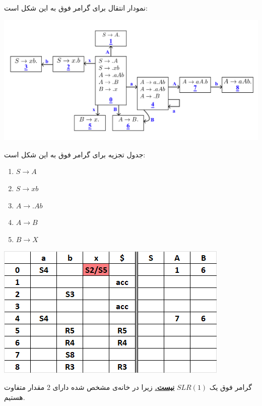 نمودار انتقال برای گرامر فوق به این شکل است:

\qquad\qquad\qquad\qquad\qquad\includegraphics[width=1\linewidth]{figs/5.png}

جدول تجزیه برای گرامر فوق به این شکل است:

\setLTR

\begin{enumerate}
	\item $S\rightarrow A$
	\item $S\rightarrow xb$
	\item $A\rightarrow .Ab$
	\item $A\rightarrow B$
	\item $B\rightarrow X$					
\end{enumerate}

\setRTL

\quad\qquad\qquad\includegraphics[width=0.7\linewidth]{figs/6.png}

گرامر فوق یک
 $SLR(1)$
 \textbf{\underline{نیست.}}
 زیرا در خانه‌ی مشخص شده دارای 2 مقدار متفاوت هستیم.